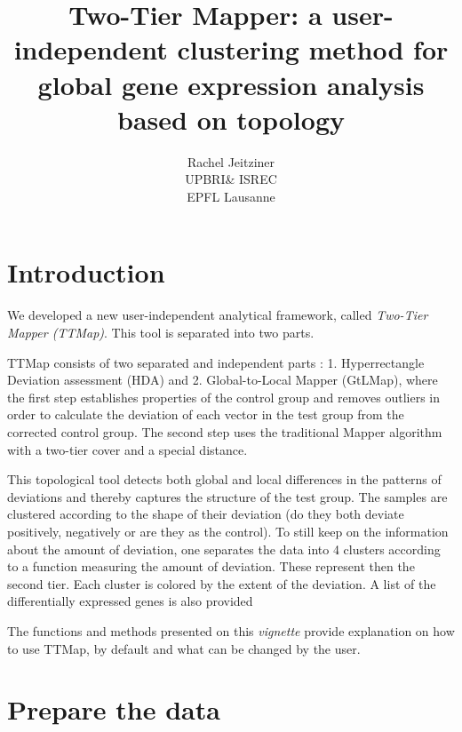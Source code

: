\documentclass[a4paper,12pt]{article}
\begin{document}
\title{\textbf{\LARGE{Two-Tier Mapper: a user-independent clustering method for global gene expression analysis based on topology}}}
\author{Rachel Jeitziner\\
\small{UPBRI\& ISREC} \\
\small{EPFL Lausanne}}
\date{}  %
\maketitle

\tableofcontents

\section{Introduction}
\label{sec:intro}

We developed a new user-independent analytical framework, called \textit{Two-Tier Mapper (TTMap)}. This tool is separated into two parts. 

TTMap consists of two separated and independent parts : 1. Hyperrectangle Deviation assessment (HDA) and 2. Global-to-Local Mapper (GtLMap), where the first step establishes properties of the control group and removes outliers in order to calculate the deviation of each vector in the test group from the corrected control group. The second step uses the traditional Mapper algorithm \cite{Mapper} with a two-tier cover and a special distance. 

This topological tool detects both global and local differences in the patterns of deviations and thereby captures the structure of the test group. The samples are clustered according to the shape of their deviation (do they both deviate positively, negatively or are they as the control). To still keep on the information about the amount of deviation, one separates the data into 4 clusters according to a function measuring the amount of deviation. These represent then the second tier. 
Each cluster is colored by the extent of the deviation. A list of the differentially expressed genes is also provided 

The functions and methods presented on this \textit{vignette} provide
explanation on how to use TTMap, by default and what can be changed by the user. 
\section{Prepare the data}
\label{sec:intro}
\end{document}
